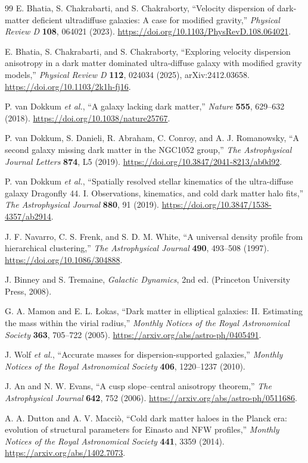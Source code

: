 \documentclass[12pt,a4paper]{report}
\numberwithin{equation}{chapter}
\begin{document}
\clearpage
{}
\begin{thebibliography}{99}
E. Bhatia, S. Chakrabarti, and S. Chakraborty,
``Velocity dispersion of dark-matter deficient ultradiffuse galaxies: A case for modified gravity,''
\emph{Physical Review D} \textbf{108}, 064021 (2023).
\url{https://doi.org/10.1103/PhysRevD.108.064021}.

E. Bhatia, S. Chakrabarti, and S. Chakraborty,
``Exploring velocity dispersion anisotropy in a dark matter dominated ultra-diffuse galaxy with modified gravity models,''
\emph{Physical Review D} \textbf{112}, 024034 (2025), arXiv:2412.03658.
\url{https://doi.org/10.1103/2k1h-fj16}.

P. van Dokkum \emph{et al.},
``A galaxy lacking dark matter,''
\emph{Nature} \textbf{555}, 629--632 (2018).
\url{https://doi.org/10.1038/nature25767}.

P. van Dokkum, S. Danieli, R. Abraham, C. Conroy, and A. J. Romanowsky,
``A second galaxy missing dark matter in the NGC1052 group,''
\emph{The Astrophysical Journal Letters} \textbf{874}, L5 (2019).
\url{https://doi.org/10.3847/2041-8213/ab0d92}.

P. van Dokkum \emph{et al.},
``Spatially resolved stellar kinematics of the ultra-diffuse galaxy Dragonfly 44. I. Observations, kinematics, and cold dark matter halo fits,''
\emph{The Astrophysical Journal} \textbf{880}, 91 (2019).
\url{https://doi.org/10.3847/1538-4357/ab2914}.

J. F. Navarro, C. S. Frenk, and S. D. M. White,
``A universal density profile from hierarchical clustering,''
\emph{The Astrophysical Journal} \textbf{490}, 493--508 (1997).
\url{https://doi.org/10.1086/304888}.

J. Binney and S. Tremaine,
\emph{Galactic Dynamics}, 2nd ed. (Princeton University Press, 2008).

G. A. Mamon and E. L. \L{}okas,
``Dark matter in elliptical galaxies: II. Estimating the mass within the virial radius,''
\emph{Monthly Notices of the Royal Astronomical Society} \textbf{363}, 705--722 (2005).
\url{https://arxiv.org/abs/astro-ph/0405491}.

J. Wolf \emph{et al.},
``Accurate masses for dispersion-supported galaxies,''
\emph{Monthly Notices of the Royal Astronomical Society} \textbf{406}, 1220--1237 (2010).

J. An and N. W. Evans,
``A cusp slope--central anisotropy theorem,''
\emph{The Astrophysical Journal} \textbf{642}, 752 (2006).
\url{https://arxiv.org/abs/astro-ph/0511686}.

A. A. Dutton and A. V. Macci\`o,
``Cold dark matter haloes in the Planck era: evolution of structural parameters for Einasto and NFW profiles,''
\emph{Monthly Notices of the Royal Astronomical Society} \textbf{441}, 3359 (2014).
\url{https://arxiv.org/abs/1402.7073}.
\end{thebibliography}
\end{document}
